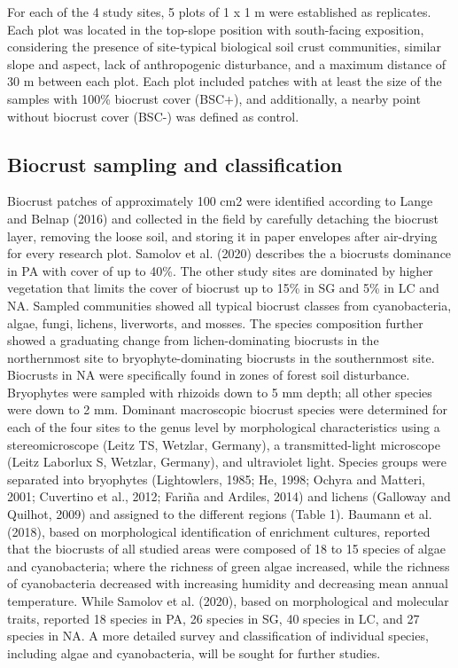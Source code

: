 For each of the 4 study sites, 5 plots of 1 x 1 m were established as replicates. Each plot was located in the top-slope position with south-facing exposition, considering the presence of site-typical biological soil crust communities, similar slope and aspect, lack of anthropogenic disturbance, and a maximum distance of 30 m between each plot. Each plot included patches with at least the size of the samples with 100\% biocrust cover (BSC+), and additionally, a nearby point without biocrust cover (BSC-) was defined as control.

\subsection{Biocrust sampling and classification}

Biocrust patches of approximately 100 cm2 were identified according to Lange and Belnap (2016) and collected in the field by carefully detaching the biocrust layer, removing the loose soil, and storing it in paper envelopes after air-drying for every research plot. Samolov et al. (2020) describes the a biocrusts dominance in PA with cover of up to 40\%. The other study sites are dominated by higher vegetation that limits the cover of biocrust up to 15\% in SG and 5\% in LC and NA. Sampled communities showed all typical biocrust classes from cyanobacteria, algae, fungi, lichens, liverworts, and mosses. The species composition further showed a graduating change from lichen-dominating biocrusts in the northernmost site to bryophyte-dominating biocrusts in the southernmost site. Biocrusts in NA were specifically found in zones of forest soil disturbance. Bryophytes were sampled with rhizoids down to 5 mm depth; all other species were down to 2 mm. Dominant macroscopic biocrust species were determined for each of the four sites to the genus level by morphological characteristics using a stereomicroscope (Leitz TS, Wetzlar, Germany), a transmitted-light microscope (Leitz Laborlux S, Wetzlar, Germany), and ultraviolet light. Species groups were separated into bryophytes (Lightowlers, 1985; He, 1998; Ochyra and Matteri, 2001; Cuvertino et al., 2012; Fariña and Ardiles, 2014) and lichens (Galloway and Quilhot, 2009) and assigned to the different regions (Table 1). Baumann et al. (2018), based on morphological identification of enrichment cultures, reported that the biocrusts of all studied areas were composed of 18 to 15 species of algae and cyanobacteria; where the richness of green algae increased, while the richness of cyanobacteria decreased with increasing humidity and decreasing mean annual temperature. While Samolov et al. (2020), based on morphological and molecular traits, reported 18 species in PA, 26 species in SG, 40 species in LC, and 27 species in NA. A more detailed survey and classification of individual species, including algae and cyanobacteria, will be sought for further studies.

